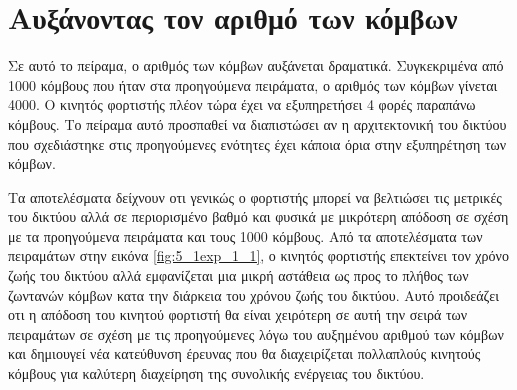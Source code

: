 



















\section{Αυξάνοντας τον αριθμό των κόμβων}\label{sc:result6}
Σε αυτό το πείραμα, ο αριθμός των κόμβων αυξάνεται δραματικά. Συγκεκριμένα από 1000 κόμβους που ήταν στα προηγούμενα πειράματα, ο αριθμός των κόμβων γίνεται 4000. Ο
κινητός φορτιστής πλέον τώρα έχει να εξυπηρετήσει 4 φορές παραπάνω κόμβους. Το πείραμα αυτό προσπαθεί να διαπιστώσει αν η αρχιτεκτονική του δικτύου που σχεδιάστηκε
στις προηγούμενες ενότητες έχει κάποια όρια στην εξυπηρέτηση των κόμβων.

Τα αποτελέσματα δείχνουν οτι γενικώς ο φορτιστής μπορεί να βελτιώσει τις μετρικές του δικτύου αλλά σε περιορισμένο βαθμό και φυσικά με μικρότερη απόδοση σε σχέση με
τα προηγούμενα πειράματα και τους 1000 κόμβους. Από τα αποτελέσματα των πειραμάτων στην εικόνα \ref{fig:5_1exp_1_1}, ο κινητός φορτιστής επεκτείνει τον χρόνο ζωής του
δικτύου αλλά εμφανίζεται μια μικρή αστάθεια ως προς το πλήθος των ζωντανών κόμβων κατα την διάρκεια του χρόνου ζωής του δικτύου. Αυτό προιδεάζει οτι η απόδοση του
κινητού φορτιστή θα είναι χειρότερη σε αυτή την σειρά των πειραμάτων σε σχέση με τις προηγούμενες λόγω του αυξημένου αριθμού των κόμβων και δημιουγεί νέα κατεύθυνση
έρευνας που θα διαχειρίζεται πολλαπλούς κινητούς κόμβους για καλύτερη διαχείρηση της συνολικής ενέργειας του δικτύου.

